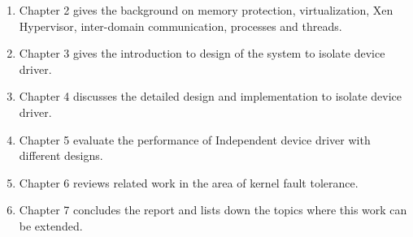 \begin{enumerate}
\item Chapter 2 gives the background on memory protection, virtualization, Xen Hypervisor, inter-domain communication, processes and threads. 
\item Chapter 3 gives the introduction to design of the system to isolate device driver. 
\item Chapter 4 discusses the detailed design and implementation to isolate device driver. 
\item Chapter 5 evaluate the performance of Independent device driver with different designs. 
\item Chapter 6 reviews related work in the area of kernel fault tolerance. 
\item Chapter 7 concludes the report and lists down the topics where this work can be extended.
\end{enumerate}

